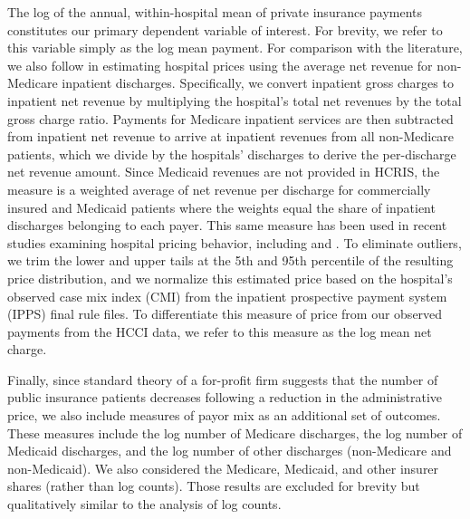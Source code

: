 \documentclass[12pt]{article}
\begin{document}
The log of the annual, within-hospital mean of private insurance payments constitutes our primary dependent variable of interest. For brevity, we refer to this variable simply as the log mean payment. For comparison with the literature, we also follow \cite{dafny2009} in estimating hospital prices using the average net revenue for non-Medicare inpatient discharges. Specifically, we convert inpatient gross charges to inpatient net revenue by multiplying the hospital's total net revenues by the total gross charge ratio. Payments for Medicare inpatient services are then subtracted from inpatient net revenue to arrive at inpatient revenues from all non-Medicare patients, which we divide by the hospitals' discharges to derive the per-discharge net revenue amount. Since Medicaid revenues are not provided in HCRIS, the measure is a weighted average of net revenue per discharge for commercially insured and Medicaid patients where the weights equal the share of inpatient discharges belonging to each payer. This same measure has been used in recent studies examining hospital pricing behavior, including \cite{schmitt2017} and \cite{lewis2015}. To eliminate outliers, we trim the lower and upper tails at the 5th and 95th percentile of the resulting price distribution, and we normalize this estimated price based on the hospital's observed case mix index (CMI) from the inpatient prospective payment system (IPPS) final rule files. To differentiate this measure of price from our observed payments from the HCCI data, we refer to this measure as the log mean net charge.

Finally, since standard theory of a for-profit firm suggests that the number of public insurance patients decreases following a reduction in the administrative price, we also include measures of payor mix as an additional set of outcomes. These measures include the log number of Medicare discharges, the log number of Medicaid discharges, and the log number of other discharges (non-Medicare and non-Medicaid). We also considered the Medicare, Medicaid, and other insurer shares (rather than log counts). Those results are excluded for brevity but qualitatively similar to the analysis of log counts.
\end{document}
